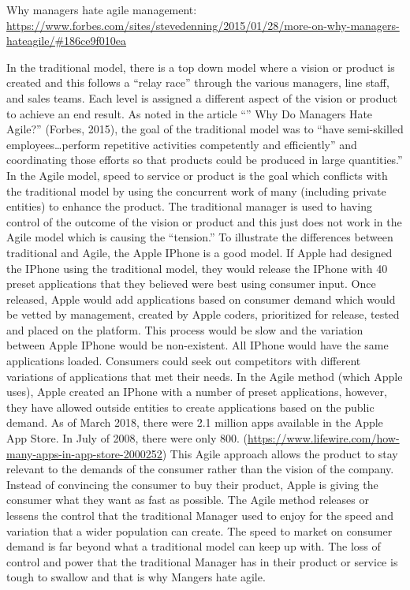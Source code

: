 \documentclass[]{book}
\theoremstyle{definition}
\theoremstyle{definition}
\theoremstyle{definition}
\theoremstyle{remark}
\begin{document}
Why managers hate agile management:
\url{https://www.forbes.com/sites/stevedenning/2015/01/28/more-on-why-managers-hateagile/\#186ce9f010ea}

In the traditional model, there is a top down model where a vision or
product is created and this follows a ``relay race'' through the various
managers, line staff, and sales teams. Each level is assigned a
different aspect of the vision or product to achieve an end result. As
noted in the article ``'' Why Do Managers Hate Agile?'' (Forbes, 2015),
the goal of the traditional model was to ``have semi-skilled
employees\ldots{}perform repetitive activities competently and
efficiently'' and coordinating those efforts so that products could be
produced in large quantities.'' In the Agile model, speed to service or
product is the goal which conflicts with the traditional model by using
the concurrent work of many (including private entities) to enhance the
product. The traditional manager is used to having control of the
outcome of the vision or product and this just does not work in the
Agile model which is causing the ``tension.'' To illustrate the
differences between traditional and Agile, the Apple IPhone is a good
model. If Apple had designed the IPhone using the traditional model,
they would release the IPhone with 40 preset applications that they
believed were best using consumer input. Once released, Apple would add
applications based on consumer demand which would be vetted by
management, created by Apple coders, prioritized for release, tested and
placed on the platform. This process would be slow and the variation
between Apple IPhone would be non-existent. All IPhone would have the
same applications loaded. Consumers could seek out competitors with
different variations of applications that met their needs. In the Agile
method (which Apple uses), Apple created an IPhone with a number of
preset applications, however, they have allowed outside entities to
create applications based on the public demand. As of March 2018, there
were 2.1 million apps available in the Apple App Store. In July of 2008,
there were only 800.
(\url{https://www.lifewire.com/how-many-apps-in-app-store-2000252}) This
Agile approach allows the product to stay relevant to the demands of the
consumer rather than the vision of the company. Instead of convincing
the consumer to buy their product, Apple is giving the consumer what
they want as fast as possible. The Agile method releases or lessens the
control that the traditional Manager used to enjoy for the speed and
variation that a wider population can create. The speed to market on
consumer demand is far beyond what a traditional model can keep up with.
The loss of control and power that the traditional Manager has in their
product or service is tough to swallow and that is why Mangers hate
agile.
\end{document}

